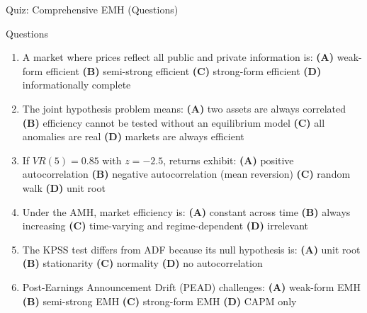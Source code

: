 \documentclass[9pt, aspectratio=169, t]{beamer}
\theoremstyle{definition}
\newenvironment{cminipage}[1]{%
    \par\noindent\hfill\begin{minipage}{#1}\ignorespaces
}{%
    \end{minipage}\hfill\null\par
}
\begin{document}
\begin{frame}{Quiz: Comprehensive EMH (Questions)}
\begin{cminipage}{0.95\textwidth}
\scriptsize
\begin{alertblock}{Questions}
\begin{enumerate}\setlength{\itemsep}{1pt}
    \item A market where prices reflect all public and private information is: \textbf{(A)} weak-form efficient \textbf{(B)} semi-strong efficient \textbf{(C)} strong-form efficient \textbf{(D)} informationally complete
    \item The joint hypothesis problem means: \textbf{(A)} two assets are always correlated \textbf{(B)} efficiency cannot be tested without an equilibrium model \textbf{(C)} all anomalies are real \textbf{(D)} markets are always efficient
    \item If $VR(5) = 0.85$ with $z = -2.5$, returns exhibit: \textbf{(A)} positive autocorrelation \textbf{(B)} negative autocorrelation (mean reversion) \textbf{(C)} random walk \textbf{(D)} unit root
    \item Under the AMH, market efficiency is: \textbf{(A)} constant across time \textbf{(B)} always increasing \textbf{(C)} time-varying and regime-dependent \textbf{(D)} irrelevant
    \item The KPSS test differs from ADF because its null hypothesis is: \textbf{(A)} unit root \textbf{(B)} stationarity \textbf{(C)} normality \textbf{(D)} no autocorrelation
    \item Post-Earnings Announcement Drift (PEAD) challenges: \textbf{(A)} weak-form EMH \textbf{(B)} semi-strong EMH \textbf{(C)} strong-form EMH \textbf{(D)} CAPM only
\end{enumerate}
\end{alertblock}
\end{cminipage}
\end{frame}
\end{document}
